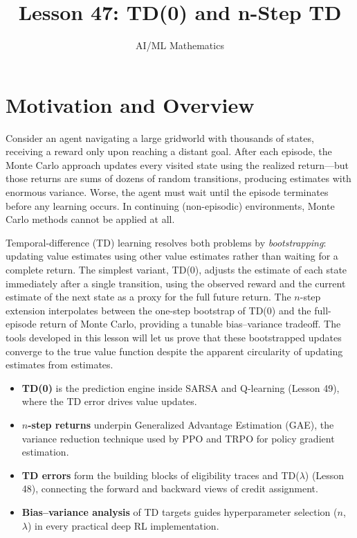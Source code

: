 \documentclass[11pt,a4paper]{article}
\title{Lesson 47: TD(0) and n-Step TD}
\author{AI/ML Mathematics}
\date{}
\begin{document}
\maketitle
\tableofcontents
\newpage

\section{Motivation and Overview}
\label{sec:motivation}

Consider an agent navigating a large gridworld with thousands of states,
receiving a reward only upon reaching a distant goal. After each episode,
the Monte Carlo approach updates every visited state using the realized
return---but those returns are sums of dozens of random transitions,
producing estimates with enormous variance. Worse, the agent must wait
until the episode terminates before any learning occurs. In continuing
(non-episodic) environments, Monte Carlo methods cannot be applied at all.

Temporal-difference (TD) learning resolves both problems by
\emph{bootstrapping}: updating value estimates using other value estimates
rather than waiting for a complete return. The simplest variant, TD(0),
adjusts the estimate of each state immediately after a single transition,
using the observed reward and the current estimate of the next state as a
proxy for the full future return. The $n$-step extension interpolates
between the one-step bootstrap of TD(0) and the full-episode return of
Monte Carlo, providing a tunable bias--variance tradeoff. The tools
developed in this lesson will let us prove that these bootstrapped updates
converge to the true value function despite the apparent circularity of
updating estimates from estimates.

\begin{rlconnection}[title={Where TD(0) and $n$-Step TD Appear}]
\begin{itemize}[nosep]
  \item \textbf{TD(0)} is the prediction engine inside SARSA and
    Q-learning (Lesson 49), where the TD error drives value updates.
  \item \textbf{$n$-step returns} underpin Generalized Advantage
    Estimation (GAE), the variance reduction technique used by PPO and
    TRPO for policy gradient estimation.
  \item \textbf{TD errors} form the building blocks of eligibility traces
    and TD($\lambda$) (Lesson 48), connecting the forward and backward
    views of credit assignment.
  \item \textbf{Bias--variance analysis} of TD targets guides
    hyperparameter selection ($n$, $\lambda$) in every practical deep RL
    implementation.
\end{itemize}
\end{rlconnection}
\end{document}
